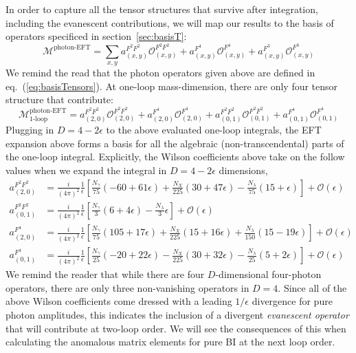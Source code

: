 \documentclass[12pt,letter]{article}
\def\sect#1{section~\ref{#1}}
\def\eqn#1{eq.~(\ref{#1})}
\def\be{\begin{equation}}
\def\ee{\end{equation}}
\begin{document}
In order to capture all the tensor structures that survive after integration, including the evanescent contributions, we will map our results to the basis of operators specificed in \sect{sec:basisT}:
\be
\mathcal{M}^{\text{photon-EFT}} = \sum_{x,y} a_{(x,y)}^{F^2F^2}\mathcal{O}^{F^2F^2}_{(x,y)}+a_{(x,y)}^{F^4}\mathcal{O}^{F^4}_{(x,y)}+a_{(x,y)}^{F^3}\mathcal{O}^{F^3}_{(x,y)}
\ee
We remind the read that the photon operators given above are defined in \eqn{eq:basisTensors}. At one-loop mass-dimension, there are only four tensor structure that contribute:
\be
\mathcal{M}^{\text{photon-EFT}}_{\text{1-loop}} = a_{(2,0)}^{F^2F^2}\mathcal{O}^{F^2F^2}_{(2,0)}+a_{(2,0)}^{F^4}\mathcal{O}^{F^4}_{(2,0)}+a_{(0,1)}^{F^2F^2}\mathcal{O}^{F^2F^2}_{(0,1)}+a_{(0,1)}^{F^4}\mathcal{O}^{F^4}_{(0,1)}
\ee
Plugging in $D=4-2\epsilon$ to the above evaluated one-loop integrals, the EFT expansion above forms a basis for all the algebraic (non-transcendental) parts of the one-loop integral. Explicitly, the Wilson coefficients above take on the follow values when we expand the integral in $D=4-2\epsilon$ dimensions,
\begin{align}
a_{(2,0)}^{F^2F^2}&=\frac{i}{(4\pi)^2}\frac{1}{\epsilon}\left[\frac{N_\gamma }{75}(-60+61\epsilon)+\frac{N_X }{225}(30+47\epsilon)-\frac{N_\lambda }{75}(15+\epsilon)\right]+\mathcal{O}(\epsilon)
\\
a_{(0,1)}^{F^2F^2}&=\frac{i}{(4\pi)^2}\frac{1}{\epsilon}\left[\frac{N_\gamma }{3}(6+4\epsilon)-\frac{N_\lambda}{3}\epsilon\right]+\mathcal{O}(\epsilon)
\\
a_{(2,0)}^{F^4}&=\frac{i}{(4\pi)^2}\frac{1}{\epsilon}\left[\frac{N_\gamma }{75}(105+17\epsilon)+\frac{N_X }{225}(15+16\epsilon)+\frac{N_\lambda }{150}(15-19\epsilon)\right]+\mathcal{O}(\epsilon)
\\
a_{(0,1)}^{F^4}&=\frac{i}{(4\pi)^2}\frac{1}{\epsilon}\left[\frac{N_\gamma }{25}(-20+22\epsilon)-\frac{N_X }{225}(30+32\epsilon)-\frac{N_\lambda }{25}(5+2\epsilon)\right]+\mathcal{O}(\epsilon)
\end{align}
We remind the reader that while there are four $D$-dimensional four-photon operators, there are only three non-vanishing operators in $D=4$. Since all of the above Wilson coefficients come dressed with a leading $1/\epsilon$ divergence for pure photon amplitudes, this indicates the inclusion of a divergent \textit{evanescent operator} that will contribute at two-loop order. We will see the consequences of this when calculating the anomalous matrix elements for pure BI at the next loop order. 
\end{document}
